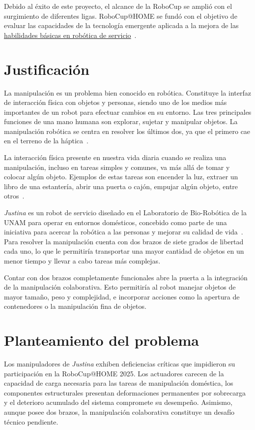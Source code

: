 Debido al éxito de este proyecto, el alcance de la RoboCup se amplió con el surgimiento de diferentes ligas. RoboCup@HOME se fundó con el objetivo de evaluar las capacidades de la tecnología emergente aplicada a la mejora de las \hyperlink{basic_skills}{habilidades básicas en robótica de servicio}~\cite{robocup_athome}.

\section{Justificación}

La manipulación es un problema bien conocido en robótica. Constituye la interfaz de interacción física con objetos y personas, siendo uno de los medios más importantes de un robot para efectuar cambios en su entorno. Las tres principales funciones de una mano humana son explorar, sujetar y manipular objetos. La manipulación robótica se centra en resolver los últimos dos, ya que el primero cae en el terreno de la háptica~\cite{bicchi_grasping}.

La interacción física presente en nuestra vida diaria cuando se realiza una manipulación, incluso en tareas simples y comunes, va más allá de tomar y colocar algún objeto. Ejemplos de estas tareas son encender la luz, extraer un libro de una estantería, abrir una puerta o cajón, empujar algún  objeto, entre otros~\cite{jaume2_manipulation}.

\emph{Justina} es un robot de servicio diseñado en el Laboratorio de Bio-Robótica de la UNAM para operar en entornos domésticos, concebido como parte de una iniciativa para acercar la robótica a las personas y mejorar su calidad de vida~\cite{BioRoboticsUNAM}. Para resolver la manipulación cuenta con dos brazos de siete grados de libertad cada uno, lo que le permitiría transportar una mayor cantidad de objetos en un menor tiempo y llevar a cabo tareas más complejas.

Contar con dos brazos completamente funcionales abre la puerta a la integración de la manipulación colaborativa. Esto permitiría al robot manejar objetos de mayor tamaño, peso y complejidad, e incorporar acciones como la apertura de contenedores o la manipulación fina de objetos.

\section{Planteamiento del problema}

Los manipuladores de \emph{Justina} exhiben deficiencias críticas que impidieron su participación en la RoboCup@HOME 2025. Los actuadores carecen de la capacidad de carga necesaria para las tareas de manipulación doméstica, los componentes estructurales presentan deformaciones permanentes por sobrecarga y el deterioro acumulado del sistema compromete su desempeño. Asimismo, aunque posee dos brazos, la manipulación colaborativa constituye un desafío técnico pendiente.

